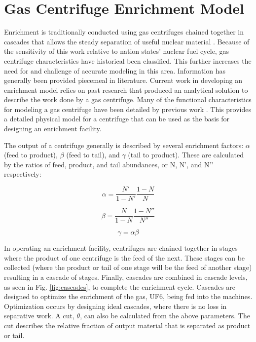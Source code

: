 \documentclass{article}
\begin{document}
\section{Gas Centrifuge Enrichment Model}

Enrichment is traditionally conducted using gas centrifuges chained together in cascades that allows the steady separation of useful nuclear material \cite{avery}. Because of the sensitivity of this work relative to nation states’ nuclear fuel cycle, gas centrifuge characteristics have historical been classified. This further increases the need for and challenge of accurate modeling in this area. Information has generally been provided piecemeal in literature. Current work in developing an enrichment model relies on past research that produced an analytical solution \cite{raetz.phd} to describe the work done by a gas centrifuge. Many of the functional characteristics for modeling a gas centrifuge have been detailed by previous work \cite{glaser.2008}. This provides a detailed physical model for a centrifuge that can be used as the basis for designing an enrichment facility.

The output of a centrifuge generally is described by several enrichment factors: $\alpha$ (feed to product), $\beta$ (feed to tail), and $\gamma$ (tail to product). These are calculated by the ratios of feed, product, and tail abundances, or N, N’, and N’’ respectively:

\begin{equation}
    \alpha = \frac{N'}{1-N'}\frac{1-N}{N}
\end{equation}

\begin{equation}
    \beta = \frac{N}{1-N}\frac{1-N''}{N''}
\end{equation}

\begin{equation}
    \gamma = \alpha\beta
\end{equation}

In operating an enrichment facility, centrifuges are chained together in stages where the product of one centrifuge is the feed of the next. These stages can be collected (where the product or tail of one stage will be the feed of another stage) resulting in a cascade of stages. Finally, cascades are combined in cascade levels, as seen in Fig. \ref{fig:cascades}, to complete the enrichment cycle. Cascades are designed to optimize the enrichment of the gas, UF6, being fed into the machines. Optimization occurs by designing ideal cascades, where there is no loss in separative work. A cut, $\theta$, can also be calculated from the above parameters. The cut describes the relative fraction of output material that is separated as product or tail.
\end{document}
